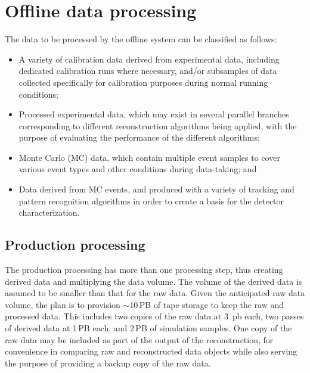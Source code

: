 \section{Offline data processing} %
\label{sec:protodune-offline}

The data to be processed by the offline system can be classified as follows:
\begin{itemize}

\item A variety of calibration data derived from experimental data, including dedicated calibration
runs where necessary, and/or subsamples of data collected specifically for calibration
purposes during normal running conditions;

\item Processed experimental data, which may exist in several parallel branches corresponding to
different reconstruction algorithms being applied, with the purpose of evaluating the performance
of the different algorithms;

\item Monte Carlo (MC) data, which contain multiple event samples to cover various event types
and other conditions during data-taking; and %

\item Data derived from MC events, and produced with a variety of tracking and pattern recognition algorithms
in order to create a basis for the detector characterization.

\end{itemize}

\subsection{Production processing}
\label{sec:prod-process}

The production processing has more than one processing step,
thus creating derived data and multiplying the data volume.  The volume of the derived data is assumed to be smaller than that for the raw data.
Given the anticipated raw data volume, %
the %
plan is to provision $\sim$10\,PB of tape storage to keep the raw and processed data. This includes
two copies of the raw data at 3~pb each, two passes of derived data at 1\,PB each, and 2\,PB of simulation samples.
One copy of the raw data may be included as part of the output of the reconstruction, for convenience in comparing
raw and reconstructed data objects while also serving the purpose of providing a backup copy of the raw data.


